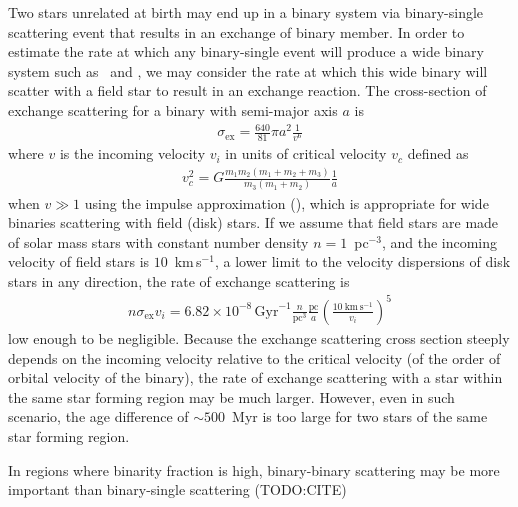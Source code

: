 \documentclass[manuscript]{aastex6}
\newcommand{\sunanalog}{\text{Krios}}
\newcommand{\bizarreone}{\text{Kronos}}
\newcommand{\todo}[1]{{\color{blue}TODO:#1}}
\begin{document}
Two stars unrelated at birth may end up in a binary system via binary-single scattering event
that results in an exchange of binary member.
In order to estimate the rate at which any binary-single
event will produce a wide binary system such as \sunanalog\ and \bizarreone,
we may consider the rate at which this wide binary will scatter with a field star to
result in an exchange reaction.
The cross-section of exchange scattering for a binary with semi-major axis $a$ is
\begin{eqnarray}
  \sigma_\mathrm{ex} = \frac{640}{81} \pi a^{2} \frac{1}{v^6}
\end{eqnarray}
where $v$ is the incoming velocity $v_i$ in units of critical velocity $v_c$ defined as
\begin{eqnarray}
  v_c^2 = G \frac{m_1 m_2 (m_1 + m_2 + m_3)}{m_3 (m_1 + m_2)} \frac{1}{a}
\end{eqnarray}
when $v \gg 1$ using the impulse approximation (\citealt{Hut:1983aa,Hut:1983ab}),
which is appropriate for wide binaries scattering with field (disk) stars.
If we assume that field stars are made of solar mass stars
with constant number density $n=1$~pc$^{-3}$, and the incoming velocity of field stars
is $10$~km\,s$^{-1}$, a lower limit to the velocity dispersions of disk
stars in any direction, the rate of exchange scattering is
\begin{eqnarray}
  n \sigma_\mathrm{ex} v_i = 6.82\times 10^{-8}\,\mathrm{Gyr}^{-1}
  \frac{n}{\mathrm{pc}^3} \frac{\mathrm{pc}}{a} \left(\frac{10~\mathrm{km}\,\mathrm{s}^{-1}}{v_i}\right)^5
\end{eqnarray}
low enough to be negligible.
Because the exchange scattering cross section steeply depends on the incoming velocity
relative to the critical velocity (of the order of orbital velocity of the binary),
the rate of exchange scattering with a star within the same star forming region
may be much larger.
However, even in such scenario, the age difference of $\sim 500$~Myr is too large
for two stars of the same star forming region.

In regions where binarity fraction is high, binary-binary scattering may be more important
than binary-single scattering (\todo{CITE})


\end{document}
